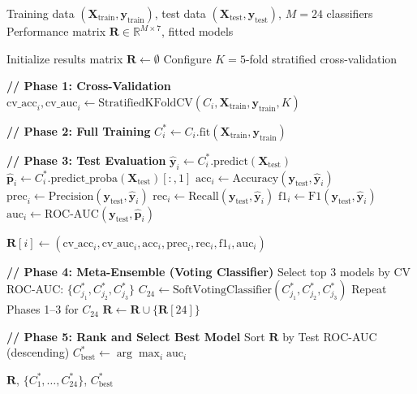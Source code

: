 \documentclass[conference,10pt]{IEEEtran}
\begin{document}
\begin{algorithm}[!t]
\caption{NAFLD Model Training Pipeline}
\label{alg:training}
\small
\begin{algorithmic}[1]
\REQUIRE Training data $(\mathbf{X}_{\text{train}}, \mathbf{y}_{\text{train}})$, test data $(\mathbf{X}_{\text{test}}, \mathbf{y}_{\text{test}})$, $M{=}24$ classifiers
\ENSURE Performance matrix $\mathbf{R} \in \mathbb{R}^{M \times 7}$, fitted models

\STATE Initialize results matrix $\mathbf{R} \leftarrow \emptyset$
\STATE Configure $K=5$-fold stratified cross-validation

    \STATE \textbf{// Phase 1: Cross-Validation}
    \STATE $\text{cv\_acc}_i, \text{cv\_auc}_i \leftarrow \text{StratifiedKFoldCV}(C_i, \mathbf{X}_{\text{train}}, \mathbf{y}_{\text{train}}, K)$

    \STATE \textbf{// Phase 2: Full Training}
    \STATE $C_i^* \leftarrow C_i.\text{fit}(\mathbf{X}_{\text{train}}, \mathbf{y}_{\text{train}})$

    \STATE \textbf{// Phase 3: Test Evaluation}
    \STATE $\hat{\mathbf{y}}_i \leftarrow C_i^*.\text{predict}(\mathbf{X}_{\text{test}})$
    \STATE $\hat{\mathbf{p}}_i \leftarrow C_i^*.\text{predict\_proba}(\mathbf{X}_{\text{test}})[:, 1]$
    \STATE $\text{acc}_i \leftarrow \text{Accuracy}(\mathbf{y}_{\text{test}}, \hat{\mathbf{y}}_i)$
    \STATE $\text{prec}_i \leftarrow \text{Precision}(\mathbf{y}_{\text{test}}, \hat{\mathbf{y}}_i)$
    \STATE $\text{rec}_i \leftarrow \text{Recall}(\mathbf{y}_{\text{test}}, \hat{\mathbf{y}}_i)$
    \STATE $\text{f1}_i \leftarrow \text{F1}(\mathbf{y}_{\text{test}}, \hat{\mathbf{y}}_i)$
    \STATE $\text{auc}_i \leftarrow \text{ROC-AUC}(\mathbf{y}_{\text{test}}, \hat{\mathbf{p}}_i)$

    \STATE $\mathbf{R}[i] \leftarrow (\text{cv\_acc}_i, \text{cv\_auc}_i, \text{acc}_i, \text{prec}_i, \text{rec}_i, \text{f1}_i, \text{auc}_i)$
\ENDFOR

\STATE \textbf{// Phase 4: Meta-Ensemble (Voting Classifier)}
\STATE Select top 3 models by CV ROC-AUC: $\{C_{j_1}^*, C_{j_2}^*, C_{j_3}^*\}$
\STATE $C_{24} \leftarrow \text{SoftVotingClassifier}(C_{j_1}^*, C_{j_2}^*, C_{j_3}^*)$
\STATE Repeat Phases 1--3 for $C_{24}$
\STATE $\mathbf{R} \leftarrow \mathbf{R} \cup \{\mathbf{R}[24]\}$

\STATE \textbf{// Phase 5: Rank and Select Best Model}
\STATE Sort $\mathbf{R}$ by Test ROC-AUC (descending)
\STATE $C^*_{\text{best}} \leftarrow \arg\max_{i} \text{auc}_i$

\RETURN $\mathbf{R}$, $\{C_1^*, \ldots, C_{24}^*\}$, $C^*_{\text{best}}$
\end{algorithmic}
\end{algorithm}
\end{document}
